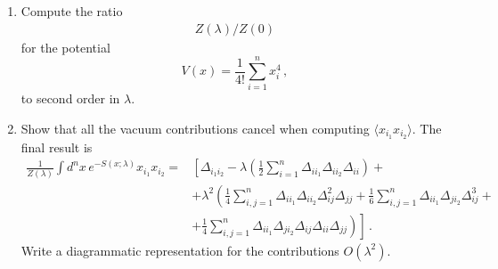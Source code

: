 \documentclass{tutorial}
\begin{document}
\begin{enumerate}
\item   Compute the ratio 
\begin{align}
  Z(\lambda)/Z(0)
\end{align}
for the potential 
\begin{equation}
  \label{eq:QuarticPot}
  V(x) = \frac{1}{4!} \sum_{i=1}^n x_i^4\, ,
\end{equation}
to second order in $\lambda$.

\item Show that all the vacuum contributions cancel when computing
  $\langle x_{i_1} x_{i_2}\rangle$. The final result is
  \begin{align}
    \frac{1}{Z(\lambda)} \int d^nx\, e^{-S(x;\lambda)} 
    x_{i_1} x_{i_2} = & 
                             \left[
                             \Delta_{i_1 i_2} - \lambda  \left(\frac12 \sum_{i=1}^n
                             \Delta_{i i_1} \Delta_{i i_2} \Delta_{i i}\right) 
                             + \right. \nonumber \\
                           & \left.
                             + \lambda^2 \left( 
                             \frac{1}{4} \sum_{i,j=1}^n \Delta_{i i_1}
                             \Delta_{i i_2} \Delta_{i j}^2 \Delta_{jj}
                             + \frac{1}{6} \sum_{i,j=1}^n \Delta_{i i_1}
                             \Delta_{j i_2} \Delta_{i j}^3 +
                             \right. \right. \nonumber \\
    \label{eq:TwoPointNorm}
                           & + \left. \left.
                             \frac{1}{4} \sum_{i,j=1}^n \Delta_{i i_1}
                             \Delta_{j i_2} \Delta_{i j} \Delta_{ii}\Delta_{jj}
                             \right)
                             \right]\, .
  \end{align}
  Write a diagrammatic representation for the contributions $O(\lambda^2)$.

\end{enumerate}
\end{document}
